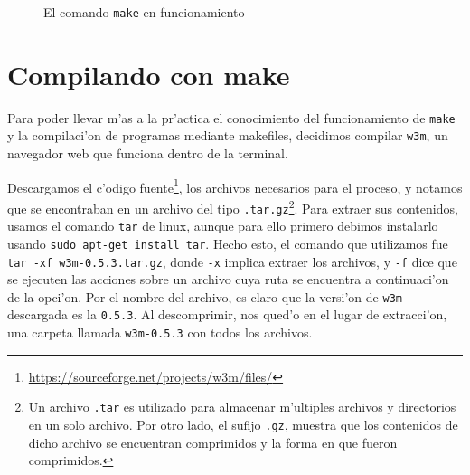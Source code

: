 \documentclass[11pt]{article}
\begin{document}
		\begin{figure}[H]
			\centering
			 \par
			
			\caption{El comando \texttt{make} en funcionamiento}
			\label{fig:makefile-successful-compile}
		\end{figure}
		
		
	\section{Compilando con make}
	
		Para poder llevar m'as a la pr'actica el conocimiento del funcionamiento de \texttt{make} y la compilaci'on de programas mediante makefiles, decidimos compilar \texttt{w3m}, un navegador web que funciona dentro de la terminal.
		
		Descargamos el c'odigo fuente\footnote{\url{https://sourceforge.net/projects/w3m/files/}}, los archivos necesarios para el proceso, y notamos que se encontraban en un archivo del tipo \texttt{.tar.gz}\footnote{Un archivo \texttt{.tar} es utilizado para almacenar m'ultiples archivos y directorios en un solo archivo. Por otro lado, el sufijo \texttt{.gz}, muestra que los contenidos de dicho archivo se encuentran comprimidos y la forma en que fueron comprimidos.}. Para extraer sus contenidos, usamos el comando \texttt{tar} de linux, aunque para ello primero debimos instalarlo usando \texttt{sudo apt-get install tar}. Hecho esto, el comando que utilizamos fue \texttt{tar -xf w3m-0.5.3.tar.gz}, donde \texttt{-x} implica extraer los archivos, y \texttt{-f} dice que se ejecuten las acciones sobre un archivo cuya ruta se encuentra a continuaci'on de la opci'on. Por el nombre del archivo, es claro que la versi'on de \texttt{w3m} descargada es la \texttt{0.5.3}. Al descomprimir, nos qued'o en el lugar de extracci'on, una carpeta llamada \texttt{w3m-0.5.3} con todos los archivos.
		
\end{document}
